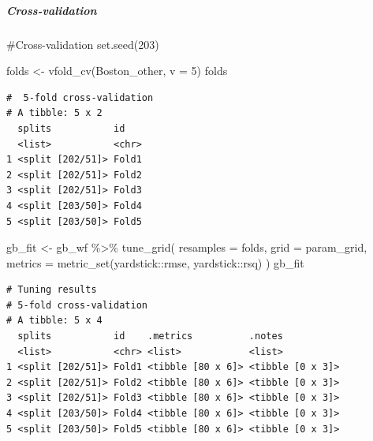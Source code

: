 \documentclass[
]{article}
\let\oldsubparagraph\subparagraph
\renewcommand{\subparagraph}[1]{\oldsubparagraph{#1}\mbox{}}
\newenvironment{Shaded}{\begin{snugshade}}{\end{snugshade}}
\newcommand{\AttributeTok}[1]{\textcolor[rgb]{0.40,0.45,0.13}{#1}}
\newcommand{\CommentTok}[1]{\textcolor[rgb]{0.37,0.37,0.37}{#1}}
\newcommand{\DecValTok}[1]{\textcolor[rgb]{0.68,0.00,0.00}{#1}}
\newcommand{\FunctionTok}[1]{\textcolor[rgb]{0.28,0.35,0.67}{#1}}
\newcommand{\NormalTok}[1]{\textcolor[rgb]{0.00,0.23,0.31}{#1}}
\newcommand{\OtherTok}[1]{\textcolor[rgb]{0.00,0.23,0.31}{#1}}
\newcommand{\SpecialCharTok}[1]{\textcolor[rgb]{0.37,0.37,0.37}{#1}}
\begin{document}
\hypertarget{cross-validation-1}{%
\subparagraph{Cross-validation}\label{cross-validation-1}}

\begin{Shaded}
\begin{Highlighting}[]
\CommentTok{\#Cross{-}validation}
\FunctionTok{set.seed}\NormalTok{(}\DecValTok{203}\NormalTok{)}

\NormalTok{folds }\OtherTok{\textless{}{-}} \FunctionTok{vfold\_cv}\NormalTok{(Boston\_other, }\AttributeTok{v =} \DecValTok{5}\NormalTok{)}
\NormalTok{folds}
\end{Highlighting}
\end{Shaded}

\begin{verbatim}
#  5-fold cross-validation 
# A tibble: 5 x 2
  splits           id   
  <list>           <chr>
1 <split [202/51]> Fold1
2 <split [202/51]> Fold2
3 <split [202/51]> Fold3
4 <split [203/50]> Fold4
5 <split [203/50]> Fold5
\end{verbatim}

\begin{Shaded}
\begin{Highlighting}[]
\NormalTok{gb\_fit }\OtherTok{\textless{}{-}}\NormalTok{ gb\_wf }\SpecialCharTok{\%\textgreater{}\%}
  \FunctionTok{tune\_grid}\NormalTok{(}
    \AttributeTok{resamples =}\NormalTok{ folds,}
    \AttributeTok{grid =}\NormalTok{ param\_grid,}
    \AttributeTok{metrics =} \FunctionTok{metric\_set}\NormalTok{(yardstick}\SpecialCharTok{::}\NormalTok{rmse, yardstick}\SpecialCharTok{::}\NormalTok{rsq)}
\NormalTok{    )}
\NormalTok{gb\_fit}
\end{Highlighting}
\end{Shaded}

\begin{verbatim}
# Tuning results
# 5-fold cross-validation 
# A tibble: 5 x 4
  splits           id    .metrics          .notes          
  <list>           <chr> <list>            <list>          
1 <split [202/51]> Fold1 <tibble [80 x 6]> <tibble [0 x 3]>
2 <split [202/51]> Fold2 <tibble [80 x 6]> <tibble [0 x 3]>
3 <split [202/51]> Fold3 <tibble [80 x 6]> <tibble [0 x 3]>
4 <split [203/50]> Fold4 <tibble [80 x 6]> <tibble [0 x 3]>
5 <split [203/50]> Fold5 <tibble [80 x 6]> <tibble [0 x 3]>
\end{verbatim}
\end{document}
